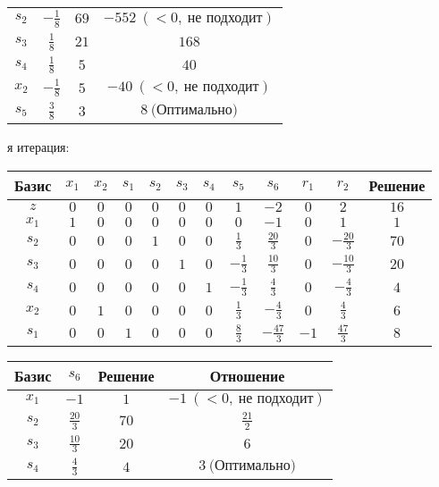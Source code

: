 \documentclass{article}%
\begin{document}
\begin{flushleft}
\begin{tabular}{|cccc|}
$s_{2}$&$-\frac{1}{8}$&$69$&$-552\: (< 0, \: \text{не подходит})$\\%
$s_{3}$&$\frac{1}{8}$&$21$&$168$\\%
$s_{4}$&$\frac{1}{8}$&$5$&$40$\\%
$x_{2}$&$-\frac{1}{8}$&$5$&$-40\: (< 0, \: \text{не подходит})$\\%
$s_{5}$&$\frac{3}{8}$&$3$&$8\: \text{(Оптимально)}$\\%
\hline%
\end{tabular}%
\newline%
\newline%
я итерация: %
\newline%
\newline%
\renewcommand{\arraystretch}{1.3}%
\begin{tabular}{|c|cccccccccc|c|}%
\hline%
Базис&$x_{1}$&$x_{2}$&$s_{1}$&$s_{2}$&$s_{3}$&$s_{4}$&$s_{5}$&$s_{6}$&$r_{1}$&$r_{2}$&Решение\\%
\hline%
$z$&$0$&$0$&$0$&$0$&$0$&$0$&$1$&$-2$&$0$&$2$&$16$\\%
\hline%
$x_{1}$&$1$&$0$&$0$&$0$&$0$&$0$&$0$&$-1$&$0$&$1$&$1$\\%
$s_{2}$&$0$&$0$&$0$&$1$&$0$&$0$&$\frac{1}{3}$&$\frac{20}{3}$&$0$&$-\frac{20}{3}$&$70$\\%
$s_{3}$&$0$&$0$&$0$&$0$&$1$&$0$&$-\frac{1}{3}$&$\frac{10}{3}$&$0$&$-\frac{10}{3}$&$20$\\%
$s_{4}$&$0$&$0$&$0$&$0$&$0$&$1$&$-\frac{1}{3}$&$\frac{4}{3}$&$0$&$-\frac{4}{3}$&$4$\\%
$x_{2}$&$0$&$1$&$0$&$0$&$0$&$0$&$\frac{1}{3}$&$-\frac{4}{3}$&$0$&$\frac{4}{3}$&$6$\\%
$s_{1}$&$0$&$0$&$1$&$0$&$0$&$0$&$\frac{8}{3}$&$-\frac{47}{3}$&$-1$&$\frac{47}{3}$&$8$\\%
\hline%
\end{tabular}%
\newline%
\newline%
\newline%
\begin{tabular}{|cccc|}%
\hline%
Базис&$s_{6}$&Решение&Отношение\\%
\hline%
$x_{1}$&$-1$&$1$&$-1\: (< 0, \: \text{не подходит})$\\%
$s_{2}$&$\frac{20}{3}$&$70$&$\frac{21}{2}$\\%
$s_{3}$&$\frac{10}{3}$&$20$&$6$\\%
$s_{4}$&$\frac{4}{3}$&$4$&$3\: \text{(Оптимально)}$\\%

\end{tabular}
\end{flushleft}
\end{document}
